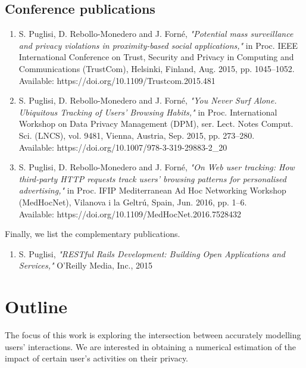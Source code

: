 \subsection{Conference publications}
\begin{enumerate}

    \item S. Puglisi, D. Rebollo-Monedero and J. Forn\'e, \emph{"Potential mass surveillance and privacy violations in proximity-based social applications,"} in Proc. IEEE International Conference on Trust, Security and Privacy in Computing and Communications (TrustCom), Helsinki, Finland, Aug. 2015, pp. 1045–1052. \\
    Available: https://doi.org/10.1109/Trustcom.2015.481
    
    \item S. Puglisi, D. Rebollo-Monedero and J. Forn\'e, \emph{"You Never Surf Alone. Ubiquitous Tracking of Users’ Browsing Habits,"} in Proc. International Workshop on Data Privacy Management (DPM), ser. Lect. Notes Comput. Sci. (LNCS), vol. 9481, Vienna, Austria, Sep. 2015, pp. 273–280. \\
    Available: https://doi.org/10.1007/978-3-319-29883-2\_20
    
    \item S. Puglisi, D. Rebollo-Monedero and J. Forn\'e, \emph{"On Web user tracking: How third-party HTTP requests track users' browsing patterns for personalised advertising,"} in Proc. IFIP Mediterranean Ad Hoc Networking Workshop (MedHocNet), Vilanova i la Geltrú, Spain, Jun. 2016, pp. 1–6. \\
    Available: https://doi.org/10.1109/MedHocNet.2016.7528432

\end{enumerate}

Finally, we list the complementary publications.

\begin{enumerate}
    \item S. Puglisi, \emph{"RESTful Rails Development: Building Open Applications and Services,"} O'Reilly Media, Inc., 2015 
    
\end{enumerate}

\section{Outline}

The focus of this work is exploring the intersection between accurately modelling users' interactions. We are interested in obtaining a numerical estimation of the impact of certain user’s activities on their privacy. 


